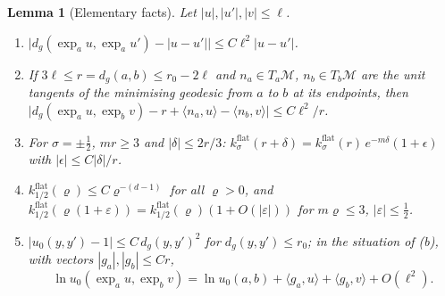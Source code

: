 \documentclass[11pt,a4paper]{article}
\theoremstyle{stmt}
\newtheorem{lemma}[theorem]{Lemma}
\theoremstyle{defn}
\theoremstyle{rmk}
\numberwithin{equation}{section}
\newcommand{\M}{\mathcal{M}}
\begin{document}
\begin{lemma}[Elementary facts]\label{lem:elem}
Let $|u|,|u'|,|v|\le\ell$.
\begin{enumerate}[label=\textup{(\alph*)}]
\item $\big|d_g(\exp_au,\exp_au')-|u-u'|\big|\le C\ell^2|u-u'|$.
\item If $3\ell\le r=d_g(a,b)\le r_0-2\ell$ and $n_a\in T_a\M$, $n_b\in T_b\M$ are the unit tangents of the minimising geodesic from $a$ to $b$ at its endpoints, then $\big|d_g(\exp_au,\exp_bv)-r+\langle n_a,u\rangle-\langle n_b,v\rangle\big|\le C\ell^2/r$.
\item For $\sigma=\pm\tfrac12$, $mr\ge3$ and $|\delta|\le2r/3$: $k^{\mathrm{flat}}_\sigma(r+\delta)=k^{\mathrm{flat}}_\sigma(r)\,e^{-m\delta}(1+\epsilon)$ with $|\epsilon|\le C|\delta|/r$.
\item $k^{\mathrm{flat}}_{1/2}(\varrho)\le C\varrho^{-(d-1)}$ for all $\varrho>0$, and $k^{\mathrm{flat}}_{1/2}(\varrho(1+\varepsilon))=k^{\mathrm{flat}}_{1/2}(\varrho)(1+O(|\varepsilon|))$ for $m\varrho\le3$, $|\varepsilon|\le\tfrac12$.
\item $|u_0(y,y')-1|\le C\,d_g(y,y')^2$ for $d_g(y,y')\le r_0$; in the situation of (b), with vectors $|g_a|,|g_b|\le Cr$,
\[
\ln u_0(\exp_au,\exp_bv)=\ln u_0(a,b)+\langle g_a,u\rangle+\langle g_b,v\rangle+O(\ell^2).
\]
\end{enumerate}
\end{lemma}
\end{document}
